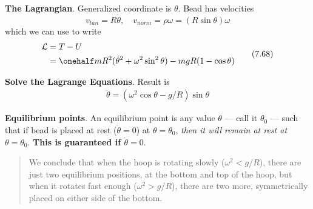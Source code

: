 \documentclass[10pt, twocolumn]{article}
\newcommand{\myspace}{\vspace{3\bigskipamount}}
\newcommand\tlab[1]{\tag{#1}\label{#1}}
\begin{document}
\begin{compactitem}
	\item \textbf{The Lagrangian}. Generalized coordinate is $\theta$. Bead has velocities
	$$ v_{tan} = R\dot{\theta}, \quad v_{norm} = \rho \omega = (R\sin\theta)\omega $$
	which we can use to write
	\begin{align}
	\begin{split}
		\mathcal L &= T - U \\
		&= \onehalf m R^2 (\dot \theta^2 + \omega^2\sin^2\theta) - mgR(1 - \cos\theta) 
	\end{split}\tlab{7.68}
	\end{align}
	
	\item \textbf{Solve the Lagrange Equations}. Result is
	\begin{align}
		\ddot{\theta} = (\omega^2 \cos\theta - g/R)\sin\theta \tlab{7.69}
	\end{align}
	
	\item \textbf{Equilibrium points}. An equilibrium point is any value $\theta$ --- call it $\theta_0$ --- such that if bead is placed at rest ($\dot \theta = 0$) at $\theta = \theta_0$, \textit{then it will remain at rest at $\theta=\theta_0$}. \textbf{This is guaranteed if $\ddot{\theta} = 0$}. 
	
	\begin{quote}
		We conclude that when the hoop is rotating slowly ($\omega^2 < g/R$), there are just two equilibrium positions, at the bottom and top of the hoop, but when it rotates fast enough ($\omega^2 > g/R$), there are two more, symmetrically placed on either side of the bottom.
	\end{quote}
\end{compactitem}



\myspace
{}
\end{document}
